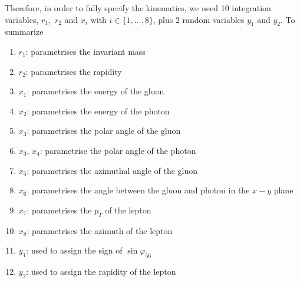 \documentclass[a4paper,11pt]{article}
\begin{document}
Therefore, in order to fully specify the kinematics, we need 10 integration
variables, \ie $r_1$,~$r_2$ and $x_i$ 
with $i \in \lbrace1,\ldots,8\rbrace$, plus 2 random variables $y_1$ and $y_2$.
To summarize
\begin{enumerate}
\item $r_1$: parametrises the invariant mass
\item $r_2$: parametrises the rapidity
\item $x_1$: parametrises the energy of the gluon
\item $x_2$: parametrises the energy of the photon
\item $x_3$: parametrises the polar angle of the gluon
\item $x_3$, $x_4$: parametrise the polar angle of the photon
\item $x_5$: parametrises the azimuthal angle of the gluon
\item $x_6$: parametrises the angle between the gluon and photon in the $x-y$ plane
\item $x_7$: parametrises the $p_T$ of the lepton
\item $x_8$: parametrises the azimuth of the lepton
\item $y_1$: used to assign the sign of $\sin\varphi_{56}$
\item $y_2$: used to assign the rapidity of the lepton
\end{enumerate}
%
%
%
%
%
%


\end{document}
